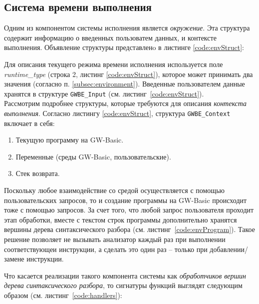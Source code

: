 \documentclass[12pt]{article}
\begin{document}
		\subsection{Система времени выполнения}
			\hspace{\parindent} Одним из компонентом системы исполнения является {\it окружение}. Эта структура содержит информацию о введенных пользоватем данных, и контексте выполнения. Объявление структуры представленo в листинге \ref{code:envStruct}:
			
			
			\indent Для описания текущего режима времени исполнения используется поле {\it runtime\_type} (строка 2, листинг \ref{code:envStruct}), которое может принимать два значения (согласно п. \ref{subsec:environment}). Введенные пользователем данные хранятся в структуре {\tt GWBE\_Input} (см. листинг~\ref{code:envStruct}). \\
			\indent Рассмотрим подробнее структуры, которые требуются для описания {\it контекста выполнения}. Согласно листингу \ref{code:envStruct}, структура {\tt GWBE\_Context} включает в себя:
			\begin{enumerate}
				\item Текущую программу на GW-Basic.
				\item Переменные (среды GW-Basic, пользовательские).
				\item Стек возврата.
			\end{enumerate}
		 	
			\indent Поскольку любое взаимодействие со средой осуществляется с помощью пользовательских запросов, то и создание программы на GW-Basic происходит тоже с помощью запросов. За счет того, что любой запрос пользователя проходит этап обработки, вместе с текстом строк программы дополнительно хранятся вершины дерева синтаксического разбора (см. листинг~\ref{code:envProgram}). Такое решение позволяет не вызывать анализатор каждый раз при выполнении соответствующеи инструкции, а сделать это один раз -- только при добавлении/замене инструкции.
			
			
			\indent Что касается реализации такого компонента системы как {\it обработчиков вершин дерева синтаксического разбора}, то сигнатуры функций выглядят следующим образом (см. листинг~\ref{code:handlers}):
			
			
\end{document}
